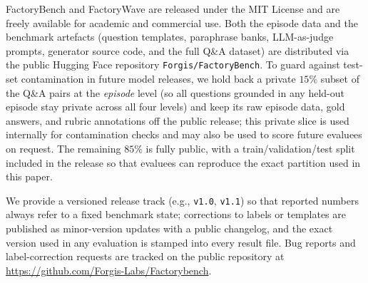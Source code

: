 \documentclass{article}
\begin{document}
FactoryBench and FactoryWave are released under the MIT License and are freely available for academic and commercial use. Both the episode data and the benchmark artefacts (question templates, paraphrase banks, LLM-as-judge prompts, generator source code, and the full Q\&A dataset) are distributed via the public Hugging Face repository \texttt{Forgis/FactoryBench}. To guard against test-set contamination in future model releases, we hold back a private $15\%$ subset of the Q\&A pairs at the \emph{episode} level (so all questions grounded in any held-out episode stay private across all four levels) and keep its raw episode data, gold answers, and rubric annotations off the public release; this private slice is used internally for contamination checks and may also be used to score future evaluees on request. The remaining $85\%$ is fully public, with a train/validation/test split included in the release so that evaluees can reproduce the exact partition used in this paper.

We provide a versioned release track (e.g., \texttt{v1.0}, \texttt{v1.1}) so that reported numbers always refer to a fixed benchmark state; corrections to labels or templates are published as minor-version updates with a public changelog, and the exact version used in any evaluation is stamped into every result file. Bug reports and label-correction requests are tracked on the public repository at \url{https://github.com/Forgis-Labs/Factorybench}.
\end{document}
